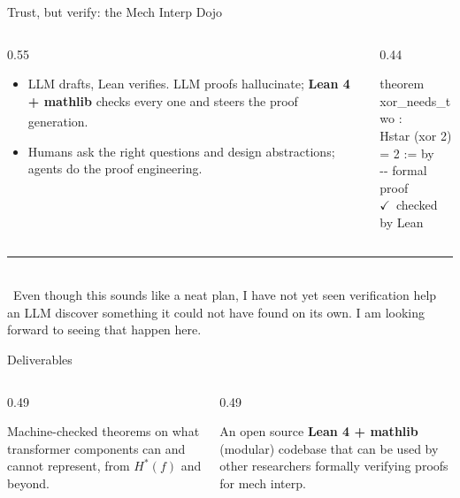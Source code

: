 \documentclass[aspectratio=169, 11pt, t]{beamer}
\newcommand{\acc}[1]{{\color{miaccent}#1}}          %
\newcommand{\pop}[1]{{\color{misharp}\textbf{#1}}}
\begin{document}
\begin{frame}{Trust, but verify: the Mech Interp Dojo}
  \begin{columns}[T]
    \begin{column}{0.55\textwidth}
      \begin{itemize}
        \item \acc{LLM drafts, Lean verifies.} LLM proofs hallucinate; \pop{Lean 4 + mathlib} checks every one and steers the proof generation.\textsuperscript{\textcolor{misharp}{\dag}}
        \item Humans ask the right questions and design abstractions; agents do the proof engineering.
      \end{itemize}
    \end{column}
    \begin{column}{0.44\textwidth}
      \begin{codebox}
        \textcolor{miaccent}{theorem} xor\_needs\_two :\\
        \hspace*{1.2em}Hstar (xor 2) = 2 := \textcolor{miaccent}{by}\\
        \hspace*{1.2em}\textcolor{mimuted}{-{}- formal proof}\\[5pt]
        {\color{green!55!black}$\checkmark$}~\textcolor{mimuted}{checked by Lean}
      \end{codebox}
    \end{column}
  \end{columns}
  \vfill
  {\footnotesize\color{mimuted}%
  \rule{0.32\linewidth}{0.3pt}\\[2pt]
  \textcolor{misharp}{\dag}~Even though this sounds like a neat plan, I have not yet seen verification help an LLM discover something it could not have found on its own. I am looking forward to seeing that happen here.\par}
\end{frame}

\begin{frame}{Deliverables}
  \begin{columns}[T]
    \begin{column}{0.49\textwidth}
      \begin{card}[title=A library of lemmas, equal height group=deliv]
        Machine-checked theorems on \acc{what transformer components can and cannot represent}, from $H^{*}(f)$ and beyond. 
      \end{card}
    \end{column}
    \begin{column}{0.49\textwidth}
      \begin{card}[title=The Mech Interp Dojo, equal height group=deliv]
        An open source \pop{Lean 4 + mathlib} (modular) codebase that can be used by other researchers formally verifying proofs for mech interp.
      \end{card}
    \end{column}
  \end{columns}
\end{frame}
\end{document}
